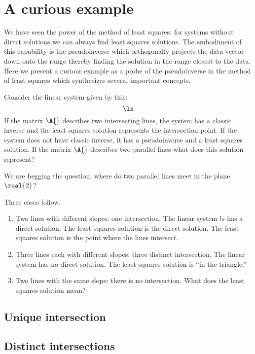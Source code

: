 \section{A curious example}

We have seen the power of the method of least squares: for systems without direct solutions we can always find least squares solutions. The embodiment of this capability is the pseudoinverse which orthogonally projects the data vector down onto the range thereby finding the solution in the range closest to the data. Here we present a curious example as a probe of the pseudoinverse in the method of least squares which synthesizes several important concepts.

Consider the linear system given by this:
\begin{equation*}
  \ls
\end{equation*}
If the matrix $\A{}$ describes two intersecting lines, the system has a classic inverse and the least squares solution represents the intersection point. If the system does not have classic inverse, it has a pseudoinverse and a least squares solution. If the matrix $\A{}$ describes two parallel lines what does this solution represent?

We are begging the question: where do two parallel lines meet in the plane $\real{2}$?

Three cases follow:
\begin{enumerate}
\item Two lines with different slopes: one intersection. The linear system $ls$ has a direct solution. The least squares solution is the direct solution. The least squares solution is the point where the lines intersect.
\item Three lines each with different slopes: three distinct intersection. The linear system has no direct solution. The least squares solution is ``in the triangle.'' 
\item Two lines with the same slope: there is no intersection. What does the least squares solution mean?
\end{enumerate}

\subsection{Unique intersection}

\subsection{Distinct intersections}

